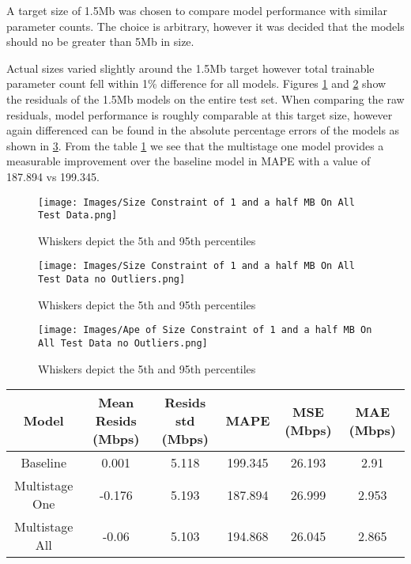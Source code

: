 A target size of 1.5Mb was chosen to compare model performance with similar parameter counts. The choice is arbitrary, however it was decided that the models should no be greater than 5Mb in size.

 Actual sizes varied slightly around the 1.5Mb target however total trainable parameter count fell within 1\% difference for all models. Figures \ref{fig:1_5_resids_outliers} and \ref{fig:1_5_resids} show the residuals of the 1.5Mb models on the entire test set. When comparing the raw residuals, model performance is roughly comparable at this target size, however again differenced can be found in the absolute percentage errors of the models as shown in \ref{fig:1_5_ape}. From the table \ref{tab:1_5_table} we see that the multistage one model provides a measurable improvement over the baseline model in MAPE with a value of 187.894 vs 199.345.

\begin{figure}[H]
\texttt{[image: Images/Size Constraint of 1 and a half MB On All Test Data.png]}
\centering
\caption{Whiskers depict the 5th and 95th percentiles}
\label{fig:1_5_resids_outliers}
\end{figure}

\begin{figure}[H]
\texttt{[image: Images/Size Constraint of 1 and a half MB On All Test Data no Outliers.png]}
\centering
\caption{Whiskers depict the 5th and 95th percentiles}
\label{fig:1_5_resids}
\end{figure}


\begin{figure}[H]
\texttt{[image: Images/Ape of Size Constraint of 1 and a half MB On All Test Data no Outliers.png]}
\centering
\caption{Whiskers depict the 5th and 95th percentiles}
\label{fig:1_5_ape}
\end{figure}

\begin{table}[H]
\centering
\begin{tabular}{|c|c|c|c|c|c|}
\hline
{Model} & {Mean Resids (Mbps)} & {Resids std (Mbps)} & {MAPE} & {MSE (Mbps)} & {MAE (Mbps)}\\
\hline
Baseline & 0.001 & 5.118 & 199.345 & 26.193 & 2.91\\
\hline
Multistage One & -0.176 & 5.193 & 187.894 & 26.999 & 2.953\\
\hline
Multistage All & -0.06 & 5.103 & 194.868 & 26.045 & 2.865\\
\hline
\end{tabular}
\label{tab:1_5_table}
\end{table}


